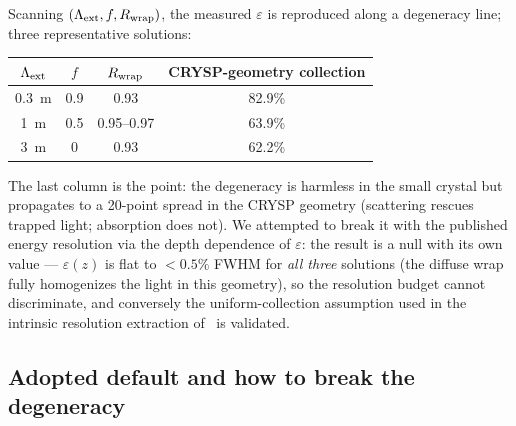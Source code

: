 \documentclass[11pt,a4paper]{article}
\newcommand{\lext}{\Lambda_{\rm ext}}
\begin{document}
Scanning $(\lext, f, R_{\rm wrap})$, the measured $\varepsilon$ is reproduced along a
degeneracy line; three representative solutions:
\begin{center}
\begin{tabular}{cccc}
  \toprule
  $\lext$ & $f$ & $R_{\rm wrap}$ & CRYSP-geometry collection \\
  \midrule
  0.3~m & 0.9 & 0.93 & 82.9\% \\
  1~m   & 0.5 & 0.95--0.97 & 63.9\% \\
  3~m   & 0   & 0.93 & 62.2\% \\
  \bottomrule
\end{tabular}
\end{center}
The last column is the point: the degeneracy is harmless in the small crystal but
propagates to a 20-point spread in the CRYSP geometry (scattering rescues trapped light;
absorption does not). We attempted to break it with the published energy resolution via
the depth dependence of $\varepsilon$: the result is a null with its own value ---
$\varepsilon(z)$ is flat to $<0.5\%$ FWHM for \emph{all three} solutions (the diffuse
wrap fully homogenizes the light in this geometry), so the resolution budget cannot
discriminate, and conversely the uniform-collection assumption used in the intrinsic
resolution extraction of~\cite{soleti2024} is validated.

\subsection{Adopted default and how to break the degeneracy}
\end{document}

